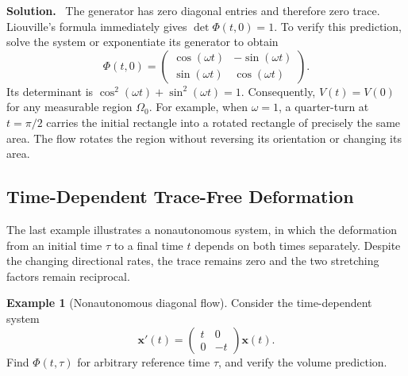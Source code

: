 \documentclass[10pt,a4paper]{article}
\numberwithin{equation}{section}
\theoremstyle{definition}
\newtheorem{example}{Example}[section]
\newenvironment{solution}{\par\noindent\textbf{Solution.}\ }{\par}
\begin{document}
\begin{solution}
The generator has zero diagonal entries and therefore zero trace. Liouville's formula immediately gives $\det\Phi(t,0)=1$. To verify this prediction, solve the system or exponentiate its generator to obtain
\begin{equation}
\Phi(t,0)=
\begin{pmatrix}
\cos(\omega t)&-\sin(\omega t)\\
\sin(\omega t)&\cos(\omega t)
\end{pmatrix}.
\label{eq:ex-rotation-phi}
\end{equation}
Its determinant is $\cos^2(\omega t)+\sin^2(\omega t)=1$. Consequently, $V(t)=V(0)$ for any measurable region $\Omega_0$. For example, when $\omega=1$, a quarter-turn at $t=\pi/2$ carries the initial rectangle into a rotated rectangle of precisely the same area. The flow rotates the region without reversing its orientation or changing its area.
\end{solution}

\subsection{Time-Dependent Trace-Free Deformation}

The last example illustrates a nonautonomous system, in which the deformation from an initial time $\tau$ to a final time $t$ depends on both times separately. Despite the changing directional rates, the trace remains zero and the two stretching factors remain reciprocal.

\begin{example}[Nonautonomous diagonal flow]
Consider the time-dependent system
\begin{equation}
\mathbf{x}'(t)=
\begin{pmatrix}t&0\\0&-t\end{pmatrix}\mathbf{x}(t).
\label{eq:ex-time-generator}
\end{equation}
Find $\Phi(t,\tau)$ for arbitrary reference time $\tau$, and verify the volume prediction.
\end{example}
\end{document}
